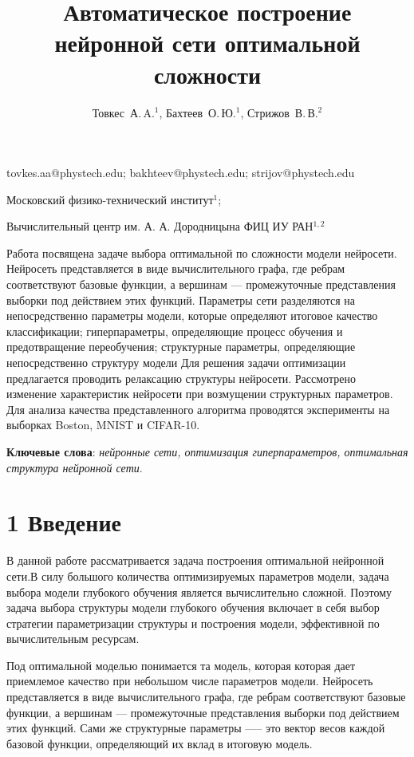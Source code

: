 \documentclass[12pt,twoside]{article}
\begin{document}
\title
    {Автоматическое построение нейронной сети оптимальной сложности}
\author
    {Товкес~А.\,A.$^1$, Бахтеев~О.\,Ю.$^1$, Стрижов~В.\,В.$^2$} %
\email
    {tovkes.aa@phystech.edu;  bakhteev@phystech.edu;  strijov@phystech.edu}
\organization
    {Московский физико-технический институт$^1$;
    	
    Вычислительный центр им. А. А. Дородницына ФИЦ ИУ РАН$^{1, 2}$}
\abstract
	{Работа посвящена задаче выбора оптимальной по сложности модели нейросети. Нейросеть представляется в виде вычислительного графа, где ребрам соответствуют базовые функции, а вершинам --- промежуточные представления выборки под действием этих функций. Параметры сети разделяются на непосредственно параметры модели, которые определяют итоговое качество классификации; гиперпараметры, определяющие процесс обучения и предотвращение переобучения; структурные параметры, определяющие непосредственно структуру модели 
    Для решения задачи оптимизации предлагается проводить релаксацию структуры нейросети. Рассмотрено изменение характеристик нейросети при возмущении структурных параметров. Для анализа качества представленного алгоритма проводятся эксперименты на выборках Boston, MNIST и CIFAR-10.

	

\bigskip
\textbf{Ключевые слова}: \emph {нейронные сети, оптимизация гиперпараметров, оптимальная структура нейронной сети}.

}
\maketitle

\section{1 Введение}
В данной работе рассматривается задача построения оптимальной нейронной сети.В силу большого количества оптимизируемых параметров модели, задача выбора модели глубокого обучения является вычислительно сложной. Поэтому задача выбора структуры модели глубокого обучения включает в себя выбор стратегии параметризации структуры и построения модели, эффективной по вычислительным ресурсам.

Под оптимальной моделью понимается та модель, которая которая дает приемлемое качество при небольшом числе параметров модели. Нейросеть представляется в виде вычислительного графа, где ребрам соответствуют базовые функции, а вершинам --- промежуточные представления выборки под действием этих функций. Сами же структурные параметры —-- это вектор весов каждой базовой функции, определяющий их вклад в итоговую модель.
\end{document}
